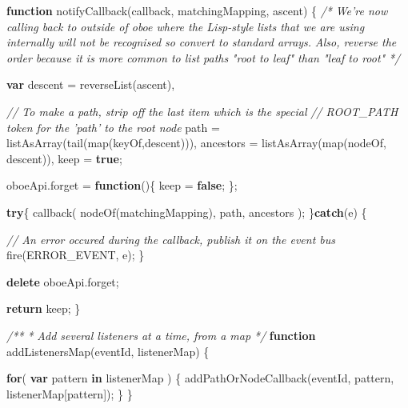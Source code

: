 \documentclass[]{article}
\newenvironment{Shaded}{}{}
\newcommand{\KeywordTok}[1]{\textcolor[rgb]{0.00,0.44,0.13}{\textbf{{#1}}}}
\newcommand{\CommentTok}[1]{\textcolor[rgb]{0.38,0.63,0.69}{\textit{{#1}}}}
\newcommand{\OtherTok}[1]{\textcolor[rgb]{0.00,0.44,0.13}{{#1}}}
\newcommand{\FunctionTok}[1]{\textcolor[rgb]{0.02,0.16,0.49}{{#1}}}
\newcommand{\NormalTok}[1]{{#1}}
\begin{document}
\begin{Shaded}
\begin{Highlighting}[]
   \KeywordTok{function} \FunctionTok{notifyCallback}\NormalTok{(callback, matchingMapping, ascent) \{}
      \CommentTok{/* }
\CommentTok{         We're now calling back to outside of oboe where the Lisp-style }
\CommentTok{         lists that we are using internally will not be recognised }
\CommentTok{         so convert to standard arrays. }
\CommentTok{  }
\CommentTok{         Also, reverse the order because it is more common to list paths }
\CommentTok{         "root to leaf" than "leaf to root" }
\CommentTok{      */}
            
      \KeywordTok{var} \NormalTok{descent     = }\FunctionTok{reverseList}\NormalTok{(ascent),}
      
          \CommentTok{// To make a path, strip off the last item which is the special}
          \CommentTok{// ROOT_PATH token for the 'path' to the root node}
          \NormalTok{path       = }\FunctionTok{listAsArray}\NormalTok{(}\FunctionTok{tail}\NormalTok{(}\FunctionTok{map}\NormalTok{(keyOf,descent))),}
          \NormalTok{ancestors  = }\FunctionTok{listAsArray}\NormalTok{(}\FunctionTok{map}\NormalTok{(nodeOf, descent)),}
          \NormalTok{keep       = }\KeywordTok{true}\NormalTok{;}
          
      \OtherTok{oboeApi}\NormalTok{.}\FunctionTok{forget} \NormalTok{= }\KeywordTok{function}\NormalTok{()\{}
         \NormalTok{keep = }\KeywordTok{false}\NormalTok{;}
      \NormalTok{\};           }
      
      \KeywordTok{try}\NormalTok{\{      }
         \FunctionTok{callback}\NormalTok{( }\FunctionTok{nodeOf}\NormalTok{(matchingMapping), path, ancestors );   }
      \NormalTok{\}}\KeywordTok{catch}\NormalTok{(e)  \{}
      
         \CommentTok{// An error occured during the callback, publish it on the event bus }
         \FunctionTok{fire}\NormalTok{(ERROR_EVENT, e);}
      \NormalTok{\}}
      
      \KeywordTok{delete} \OtherTok{oboeApi}\NormalTok{.}\FunctionTok{forget}\NormalTok{;}
      
      \KeywordTok{return} \NormalTok{keep;          }
   \NormalTok{\}}

   \CommentTok{/**}
\CommentTok{    * Add several listeners at a time, from a map}
\CommentTok{    */}
   \KeywordTok{function} \FunctionTok{addListenersMap}\NormalTok{(eventId, listenerMap) \{}
   
      \KeywordTok{for}\NormalTok{( }\KeywordTok{var} \NormalTok{pattern }\KeywordTok{in} \NormalTok{listenerMap ) \{}
         \FunctionTok{addPathOrNodeCallback}\NormalTok{(eventId, pattern, listenerMap[pattern]);}
      \NormalTok{\}}
   \NormalTok{\}    }
      

\end{Highlighting}
\end{Shaded}
\end{document}

